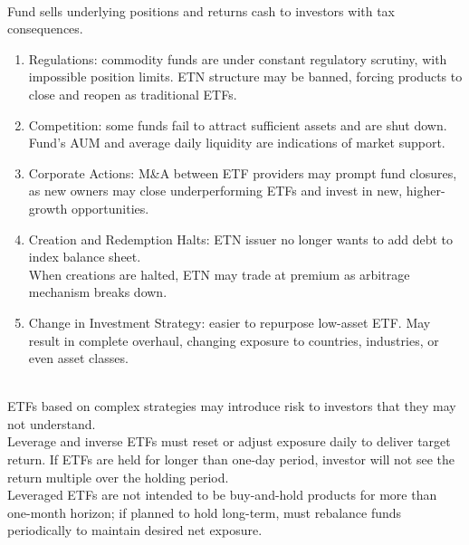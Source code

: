 \begin{remark} \\
Fund sells underlying positions and returns cash to investors with tax consequences.
\begin{enumerate}[label=\roman*.]
\setlength{\itemsep}{0pt}
\item Regulations: commodity funds are under constant regulatory scrutiny, with impossible position limits. ETN structure may be banned, forcing products to close and reopen as traditional ETFs.
\item Competition: some funds fail to attract sufficient assets and are shut down.\\
Fund's AUM and average daily liquidity are indications of market support.
\item Corporate Actions: M\&A between ETF providers may prompt fund closures, as new owners may close underperforming ETFs and invest in new, higher-growth opportunities.
\item Creation and Redemption Halts: ETN issuer no longer wants to add debt to index balance sheet.\\
When creations are halted, ETN may trade at premium as arbitrage mechanism breaks down.
\item Change in Investment Strategy: easier to repurpose low-asset ETF. May result in complete overhaul, changing exposure to countries, industries, or even asset classes.
\end{enumerate}
\end{remark}

\begin{remark} \\
ETFs based on complex strategies may introduce risk to investors that they may not understand.\\
Leverage and inverse ETFs must reset or adjust exposure daily to deliver target return. If ETFs are held for longer than one-day period, investor will not see the return multiple over the holding period.\\
Leveraged ETFs are not intended to be buy-and-hold products for more than one-month horizon; if planned to hold long-term, must rebalance funds periodically to maintain desired net exposure.
\end{remark}

